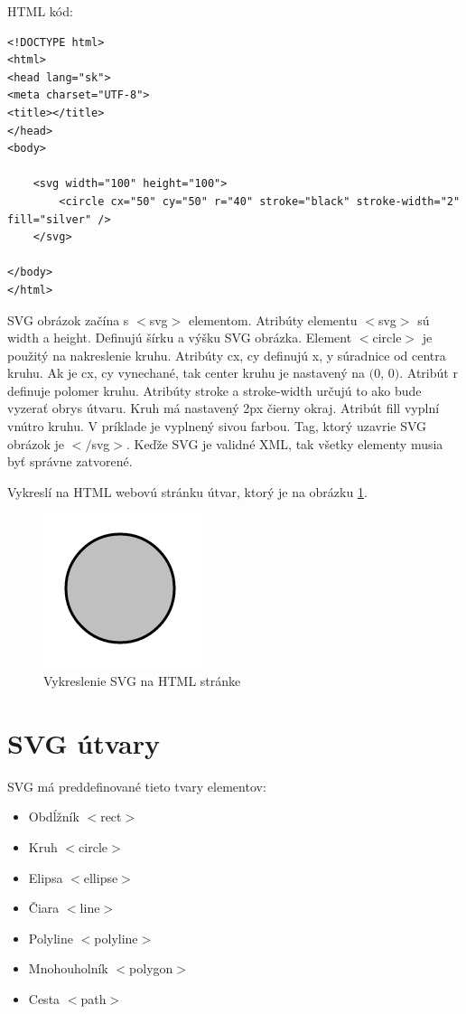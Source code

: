 HTML kód: 

\begin{lstlisting}
<!DOCTYPE html>
<html>
<head lang="sk">
<meta charset="UTF-8">
<title></title>
</head>
<body>

	<svg width="100" height="100">
		<circle cx="50" cy="50" r="40" stroke="black" stroke-width="2" fill="silver" />
	</svg>	
	
</body>
</html>

\end{lstlisting}




SVG obrázok začína s $<$svg$>$ elementom. Atribúty elementu $<$svg$>$ sú width a height. Definujú šírku a výšku SVG obrázka. Element $<$circle$>$ je použitý na nakreslenie kruhu. Atribúty cx, cy definujú x, y súradnice od centra kruhu. Ak je cx, cy vynechané, tak center kruhu je nastavený na $($0, 0$)$. Atribút r  definuje polomer kruhu. Atribúty stroke a stroke-width určujú to ako bude vyzerať obrys útvaru. Kruh má nastavený 2px čierny okraj. 
Atribút fill vyplní vnútro kruhu. V príklade je vyplnený sivou farbou. Tag, ktorý uzavrie SVG obrázok je $<$$/$svg$>$. Keďže SVG je validné XML, tak všetky elementy musia byť správne zatvorené. 


Vykreslí na HTML webovú stránku útvar, ktorý je na obrázku \ref{jednoduchyKruh}.

\begin{figure}[hp]
	\begin{center}
		\includegraphics  {obrazky/jednoduchyKruh.png}
		\caption{Vykreslenie SVG na HTML stránke}
		\label{jednoduchyKruh}
	\end{center}
\end{figure}


\section{SVG útvary} 

\acs*{SVG} má preddefinované tieto tvary elementov:
\begin{itemize}
	\item Obdĺžník $<$rect$>$
	\item Kruh $<$circle$>$
	\item Elipsa $<$ellipse$>$
	\item Čiara $<$line$>$
	\item Polyline $<$polyline$>$
	\item Mnohouholník $<$polygon$>$
	\item Cesta $<$path$>$	
\end{itemize}

